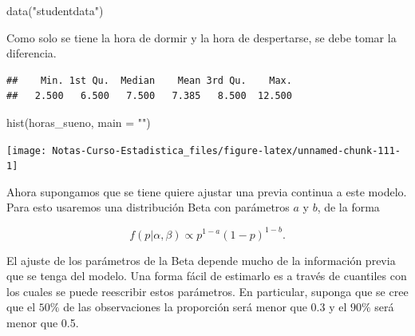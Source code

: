\documentclass[
  12pt,
]{book}
\newenvironment{Shaded}{\begin{snugshade}}{\end{snugshade}}
\newcommand{\AttributeTok}[1]{\textcolor[rgb]{0.77,0.63,0.00}{#1}}
\newcommand{\FunctionTok}[1]{\textcolor[rgb]{0.00,0.00,0.00}{#1}}
\newcommand{\NormalTok}[1]{#1}
\newcommand{\OtherTok}[1]{\textcolor[rgb]{0.56,0.35,0.01}{#1}}
\newcommand{\SpecialCharTok}[1]{\textcolor[rgb]{0.00,0.00,0.00}{#1}}
\newcommand{\StringTok}[1]{\textcolor[rgb]{0.31,0.60,0.02}{#1}}
\theoremstyle{definition}
\theoremstyle{definition}
\theoremstyle{definition}
\theoremstyle{remark}
\begin{document}
\begin{Shaded}
\begin{Highlighting}[]
\FunctionTok{data}\NormalTok{(}\StringTok{"studentdata"}\NormalTok{)}
\end{Highlighting}
\end{Shaded}

Como solo se tiene la hora de dormir y la hora de despertarse, se debe tomar la diferencia.

\begin{Shaded}
\end{Shaded}

\begin{verbatim}
##    Min. 1st Qu.  Median    Mean 3rd Qu.    Max. 
##   2.500   6.500   7.500   7.385   8.500  12.500
\end{verbatim}

\begin{Shaded}
\begin{Highlighting}[]
\FunctionTok{hist}\NormalTok{(horas\_sueno, }\AttributeTok{main =} \StringTok{""}\NormalTok{)}
\end{Highlighting}
\end{Shaded}

\begin{center}\texttt{[image: Notas-Curso-Estadistica\_files/figure-latex/unnamed-chunk-111-1]} \end{center}

Ahora supongamos que se tiene quiere ajustar una previa continua a este modelo. Para esto usaremos una distribución Beta con parámetros \(a\) y \(b\), de la forma

\[
    f(p\vert \alpha, \beta) \propto p^{1-a} (1-p)^{1-b}.
\]

El ajuste de los parámetros de la Beta depende mucho de la información
previa que se tenga del modelo. Una forma fácil de estimarlo es a
través de cuantiles con los cuales se puede reescribir estos
parámetros. En particular, suponga que se cree que el \(50\%\) de las
observaciones la proporción será menor que 0.3 y el \(90\%\) será menor
que 0.5.
\end{document}
